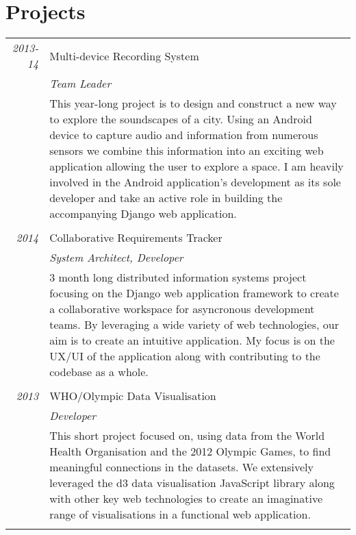 \documentclass[a4paper,10pt]{article}
\begin{document}
\section{Projects}
\begin{tabular}{r|p{11cm}}
\emph {2013-14} & Multi-device Recording System \\&\emph{Team Leader}\\&\footnotesize{This year-long project is to design and construct a new way to explore the soundscapes of a city. Using an Android device to capture audio and information from numerous sensors we combine this information into an exciting web application allowing the user to explore a space. I am heavily involved in the Android application's development as its sole developer and take an active role in building the accompanying Django web application.}\\\multicolumn{2}{c}{} \\
\emph {2014} & Collaborative Requirements Tracker \\&\emph{System Architect, Developer}\\&\footnotesize{3 month long distributed information systems project focusing on the Django web application framework to create a collaborative workspace for asyncronous development teams. By leveraging a wide variety of web technologies, our aim is to create an intuitive application. My focus is on the UX/UI of the application along with contributing to the codebase as a whole.}\\\multicolumn{2}{c}{} \\
\emph {2013} & WHO/Olympic Data Visualisation \\&\emph{Developer}\\&\footnotesize{This short project focused on, using data from the World Health Organisation and the 2012 Olympic Games, to find meaningful connections in the datasets. We extensively leveraged the d3 data visualisation JavaScript library along with other key web technologies to create an imaginative range of visualisations in a functional web application. }\\\multicolumn{2}{c}{} \\
\end{tabular}

\end{document}
